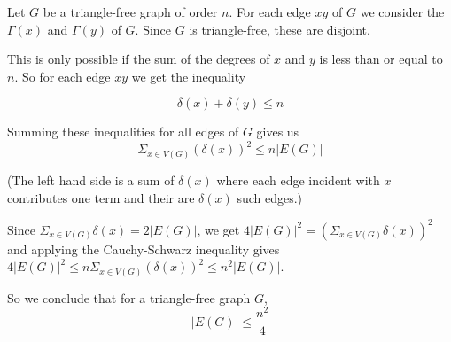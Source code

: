 \documentclass[12pt]{article}
\begin{document}
Let $G$ be a triangle-free graph of order $n$. For each edge $xy$ of $G$ we consider the 
$\Gamma(x)$ and $\Gamma(y)$ of $G$.
Since $G$ is triangle-free, these are disjoint. 

This is only possible if the sum of the degrees of $x$ and $y$ 
is less 
than or equal to $n$. So for each edge $xy$ we get the inequality

\[
\delta(x)+\delta(y)\leq n
\]

Summing these inequalities for all edges of $G$ gives us
\[
\Sigma_{x\in V(G)} (\delta(x))^2 \leq n |E(G)|
\]

(The left hand side is a sum of $\delta(x)$ where each edge incident with $x$ 
contributes one term and their are $\delta(x)$ such edges.)

Since $\Sigma_{x\in V(G)} \delta(x) = 2 |E(G)|$, we get $4 |E(G)|^2 = 
(\Sigma_{x\in V(G)} \delta(x))^2 $ and applying the Cauchy-Schwarz inequality gives 
$4 |E(G)|^2 \leq n \Sigma_{x\in V(G)} (\delta(x))^2 \leq n^2 |E(G)|$.

So we conclude that for a triangle-free graph $G$, 
\[|E(G)|\leq\frac{n^2}{4} \]
\end{document}
